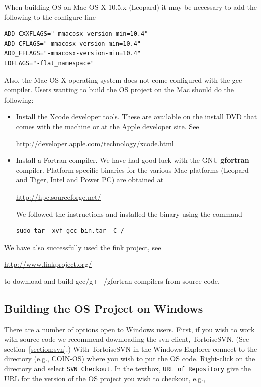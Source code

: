 \documentclass[11pt]{article}
\renewcommand{\_}{{\char"5F}}
\renewcommand{\{}{{\char"7B}}
\renewcommand{\}}{{\char"7D}}
\renewcommand{\^}{{\char"0D}}
\renewcommand{\'}{{\char"0D}}
\begin{document}
When building OS on Mac OS X 10.5.x (Leopard)   it may be necessary  to add the following to the configure line


\begin{verbatim}
ADD_CXXFLAGS="-mmacosx-version-min=10.4" 
ADD_CFLAGS="-mmacosx-version-min=10.4" 
ADD_FFLAGS="-mmacosx-version-min=10.4"
LDFLAGS="-flat_namespace"
\end{verbatim}

Also, the Mac OS X operating system does not come configured with the gcc compiler. Users wanting to build the OS project on the Mac should do the following:

\begin{itemize}
\item Install the Xcode developer tools.  These are available on the install DVD that comes with the machine or at the Apple developer site. See

\url{http://developer.apple.com/technology/xcode.html}

\item Install a Fortran compiler.  We have had good luck with the GNU {\bf gfortran} compiler. Platform specific binaries for the various Mac platforms (Leopard and Tiger, Intel and Power PC) are obtained at

\url{http://hpc.sourceforge.net/}

We followed the instructions and installed the binary using the command


\begin{verbatim}
sudo tar -xvf gcc-bin.tar -C /
\end{verbatim}

\end{itemize}

We have also successfully used the fink project, see

\url{http://www.finkproject.org/}

to download and build gcc/g++/gfortran compilers from source code. 


\subsection{Building the OS Project on Windows}\label{section:windowsinstall}

There are a number of options open to Windows users.   First, if you wish to work with source code
we recommend downloading  the svn client, TortoiseSVN.  (See section~\ref{section:svn}.)  
With TortoiseSVN
in the Windows Explorer connect to the directory (e.g., COIN-OS) where you wish to put the OS code.
Right-click on the directory and select {\tt SVN Checkout}.   In the textbox, {\tt URL of Repository}
give the URL for the version of the OS project you wish to checkout, e.g.,
\end{document}
